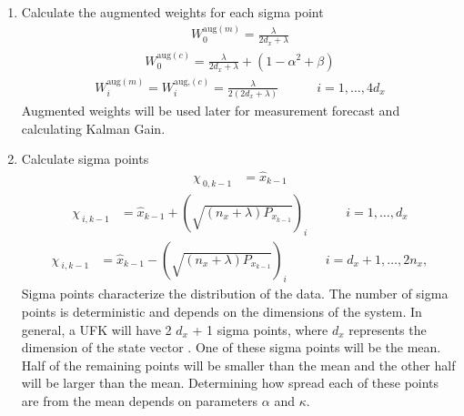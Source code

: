\begin{enumerate}
    \item Calculate the augmented weights for each sigma point 
    \begin{align*}
        W^{\text{aug}(m)}_{0} = \frac{\lambda}{2d_{x}+ \lambda } 
        \end{align*}
         \begin{align*}
        W^{\text{aug}(c)}_{0} = \frac{\lambda}{2d_{x}+ \lambda} + (1 - \alpha^{2} + \beta) 
        \end{align*}
         \begin{align*}
        W^{\text{aug}(m)}_{i} = W^{\text{aug,}(c)}_{i} = \frac{\lambda}{2(2d_{x}+ \lambda) } \quad \quad \quad i=1,\dots,4d_{x} 
    \end{align*}
    Augmented weights will be used later for measurement forecast and calculating Kalman Gain.
    \item Calculate sigma points
    \begin{align*}
        \chi_{\ 0,k-1} &= \hat{x}_{k-1} 
     \end{align*}
     \begin{align*}
        \chi_{\ i,k-1} &= \hat{x}_{k-1} + (\sqrt{(n_{x}+\lambda)P_{x_{k-1}}})_{i} \quad \quad \quad i=1,\dots,d_{x} 
        \end{align*}
        \begin{align*}
        \chi_{\ i,k-1} &= \hat{x}_{k-1} - (\sqrt{(n_{x}+\lambda)P_{x_{k-1}}})_{i} \quad \quad \quad  i=d_{x}+1,\dots,2n_{x},
    \end{align*}
    Sigma points characterize the distribution of the data. The number of sigma points is deterministic and depends on the dimensions of the system. In general, a UFK will have 2 $d_x$ + 1 sigma points, where $d_x$ represents the dimension of the state vector \cite{inbook, inproceedings, Wan01theunscented}. One of these sigma points will be the mean. Half of the remaining points will be smaller than the mean and the other half will be larger than the mean. Determining how spread each of these points are from the mean depends on parameters $\alpha$ and $\kappa$.


\end{enumerate}
